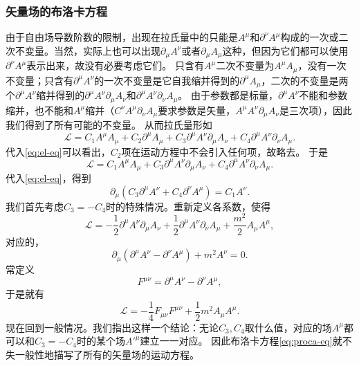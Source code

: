 \documentclass[hyperref, UTF8, a4paper]{ctexart}
\begin{document}
\subsubsection{矢量场的布洛卡方程}

由于自由场导数阶数的限制，出现在拉氏量中的只能是$A^\mu$和$\partial^\nu A^\mu$构成的一次或二次不变量。当然，实际上也可以出现$\partial_\mu A^\nu$或者$\partial_\mu A_\mu$这种，但因为它们都可以使用$\partial^\nu A^\mu$表示出来，故没有必要考虑它们。
只含有$A^\mu$二次不变量为$A^\mu A_\mu$，没有一次不变量；只含有$\partial^\mu A^\nu$的一次不变量是它自我缩并得到的$\partial^\mu A_\mu$，二次的不变量是两个$\partial^\mu A^\nu$缩并得到的$\partial^\mu A^\nu \partial_\mu A_\nu$和$\partial^\mu A^\nu \partial_\nu A_\mu$。
由于参数都是标量，$\partial^\mu A^\nu$不能和参数缩并，也不能和$A^\mu$缩并（$C^\nu A^\mu \partial_\nu A_\mu$要求参数是矢量，$A^\mu A^\nu \partial_\mu A_\nu$是三次项），因此我们得到了所有可能的不变量。
从而拉氏量形如
\[
    \mathcal{L} = C_1 A^\mu A_\mu + C_2 \partial^\mu A_\mu + C_3 \partial^\mu A^\nu \partial_\mu A_\nu + C_4 \partial^\mu A^\nu \partial_\nu A_\mu.
\]
代入\eqref{eq:el-eq}可以看出，$C_2$项在运动方程中不会引入任何项，故略去。
于是
\[
    \mathcal{L} = C_1 A^\mu A_\mu + C_3 \partial^\mu A^\nu \partial_\mu A_\nu + C_4 \partial^\mu A^\nu \partial_\nu A_\mu.
\]
代入\eqref{eq:el-eq}，得到
\begin{equation}
    \partial_\mu (C_3 \partial^\mu A^\nu +  C_4 \partial^\nu A^\mu) = C_1 A^\nu.
    \label{eq:vector-motion-eq}
\end{equation}
我们首先考虑$C_3 = - C_4$时的特殊情况。重新定义各系数，使得
\begin{equation}
    \mathcal{L} = - \frac{1}{2} \partial^\mu A^\nu \partial_\mu A_\nu + \frac{1}{2} \partial^\mu A^\nu \partial_\nu A_\mu + \frac{m^2}{2} A_\mu A^\mu,
\end{equation}
对应的，
\begin{equation}
    \partial_\mu (\partial^\mu A^\nu - \partial^\nu A^\mu) + m^2 A^\nu = 0.
    \label{eq:proca-eq}
\end{equation}
常定义
\begin{equation}
    F^{\mu \nu} = \partial^\mu A^\nu - \partial^\nu A^\mu,
\end{equation}
于是就有
\begin{equation}
    \mathcal{L} = - \frac{1}{4} F_{\mu \nu} F^{\mu \nu} + \frac{1}{2} m^2 A_\mu A^\mu.
    \label{eq:proca-lagrangian}
\end{equation}
现在回到一般情况。我们指出这样一个结论：无论$C_3,C_4$取什么值，对应的场$A^\mu$都可以和$C_3 = - C_4$时的某个场${A'}^\mu$建立一一对应。
因此布洛卡方程\eqref{eq:proca-eq}就不失一般性地描写了所有的矢量场的运动方程。
\end{document}
